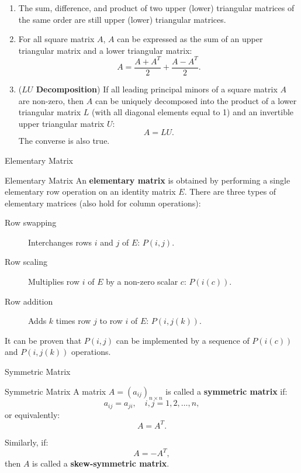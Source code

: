 \documentclass[11pt]{../../TexTemplate/elegantbook} %
\begin{document}
\begin{property}
    \begin{enumerate}
        \item The sum, difference, and product of two upper (lower) triangular matrices of the same order 
            are still upper (lower) triangular matrices. 
        \item For all square matrix \(A\), \(A\) can be expressed as the sum of 
            an upper triangular matrix and a lower triangular matrix:
            \[
            A = \frac{A + A^T}{2} + \frac{A - A^T}{2}.
            \]
        \item (\textbf{\(LU\) Decomposition}) If all leading principal minors of a square matrix \(A\) are non-zero, 
            then \(A\) can be uniquely decomposed into the product of a lower triangular matrix \(L\) 
            (with all diagonal elements equal to 1) and an invertible upper triangular matrix \(U\):
            \[
            A = LU.
            \]
            The converse is also true.
    \end{enumerate}
\end{property}


\begin{leftbarTitle}{Elementary Matrix}\end{leftbarTitle}
\begin{definition}{Elementary Matrix}
    An \textbf{elementary matrix} is obtained by performing a single elementary row operation on an identity matrix \(E\).
    There are three types of elementary matrices (also hold for column operations):
    \begin{description}
        \item [Row swapping] Interchanges rows \(i\) and \(j\) of \(E\): \(P(i,j)\).
        \item [Row scaling] Multiplies row \(i\) of \(E\) by a non-zero scalar \(c\): \(P(i(c))\).
        \item [Row addition] Adds \(k\) times row \(j\) to row \(i\) of \(E\): \(P(i,j(k))\).
    \end{description}
\end{definition}

\begin{note}
    It can be proven that \(P(i,j)\) can be implemented by a sequence of \(P(i(c))\) and \(P(i,j(k))\) operations.
\end{note}

\begin{leftbarTitle}{Symmetric Matrix}\end{leftbarTitle}
\begin{definition}{Symmetric Matrix}
    A matrix \( A = (a_{ij})_{n \times n} \) is called a \textbf{symmetric matrix} if:
    \[
    a_{ij} = a_{ji}, \quad i, j = 1, 2, \dots, n,
    \]
    or equivalently:
    \[
    A = A^T.
    \]
    
    Similarly, if:
    \[
    A = -A^T,
    \]
    then \( A \) is called a \textbf{skew-symmetric matrix}.
\end{definition}
\end{document}
